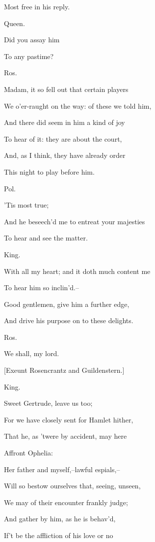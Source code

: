 \documentclass[12pt]{book}
\begin{document}
Most free in his reply.



Queen.

Did you assay him

To any pastime?



Ros.

Madam, it so fell out that certain players

We o'er-raught on the way: of these we told him,

And there did seem in him a kind of joy

To hear of it: they are about the court,

And, as I think, they have already order

This night to play before him.



Pol.

'Tis most true;

And he beseech'd me to entreat your majesties

To hear and see the matter.



King.

With all my heart; and it doth much content me

To hear him so inclin'd.--

Good gentlemen, give him a further edge,

And drive his purpose on to these delights.



Ros.

We shall, my lord.



[Exeunt Rosencrantz and Guildenstern.]



King.

Sweet Gertrude, leave us too;

For we have closely sent for Hamlet hither,

That he, as 'twere by accident, may here

Affront Ophelia:

Her father and myself,--lawful espials,--

Will so bestow ourselves that, seeing, unseen,

We may of their encounter frankly judge;

And gather by him, as he is behav'd,

If't be the affliction of his love or no
\end{document}
